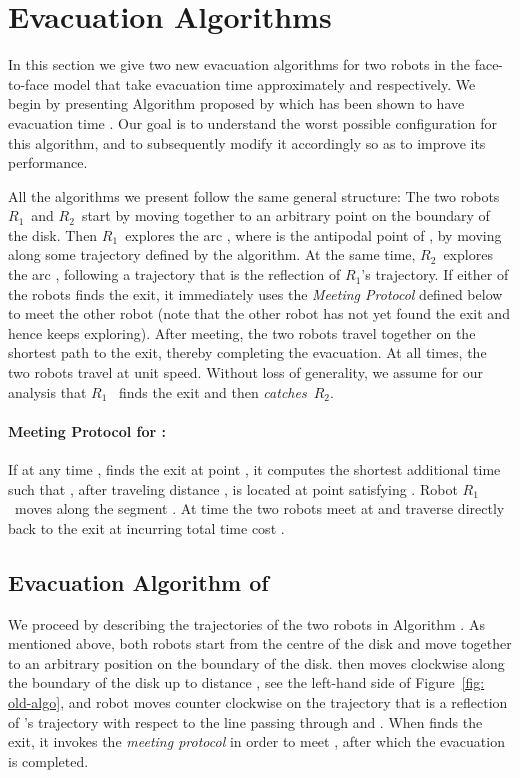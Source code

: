 \documentclass[
final
]{dmtcs-episciences}
\newcommand{\RA}{\ensuremath{R_1}}
\newcommand{\RB}{\ensuremath{R_2 }}
\newcommand{\ff}{face-to-face }
\theoremstyle{definition}
\begin{document}
\section{Evacuation Algorithms}
\label{sec:Evacuation Algorithms}


In this section we give two new evacuation algorithms for two robots in the  \ff model that take evacuation time approximately
 and  respectively. 
We begin by presenting  Algorithm  proposed by \cite{CGGKMP}
which has been shown to have evacuation time 
.
Our goal is to understand the worst possible configuration for this algorithm, and to subsequently modify it accordingly so as to improve its performance. 

 All the algorithms we present follow the same general structure: 
 The two robots \RA\ and \RB\ start by moving together to an arbitrary point  on the boundary of the disk. 
 Then \RA\ explores the arc , where  is the antipodal point of , by moving along some trajectory defined by the algorithm.
 At the same time, \RB\ explores the arc , following a trajectory that is the reflection of \RA's trajectory.
 If either of the robots finds the exit, it immediately uses the {\em Meeting Protocol} defined below to meet the other robot (note that the other robot has not yet found the exit and hence keeps exploring). 
 After meeting, the two robots travel together on the shortest path to the exit, thereby completing the evacuation. 
 At all times, the two robots travel at unit speed. 
 Without loss of generality, we assume for our analysis that \RA~ finds the exit and then {\em catches}~\RB. 



 \paragraph{Meeting Protocol for :}
If at any time ,    finds the exit at point , it 
computes the shortest additional time  such that , after traveling 
distance , is located at point  satisfying . 
Robot \RA\ moves along the segment . At time  the two robots meet 
at  and traverse  directly back to the exit at  incurring total time cost 
.

\subsection{Evacuation Algorithm  \texorpdfstring{}{Lg} of \texorpdfstring{\cite{CGGKMP}}{Lg}}


We proceed by describing the trajectories of the two robots in Algorithm  
. As mentioned above, both robots start 
from the centre  of the disk and move together to an arbitrary position  on the 
boundary of the disk.  then moves clockwise along the boundary of the disk up to distance , see the
left-hand side of Figure~\ref{fig: old-algo}, and robot  moves counter clockwise on the trajectory that is a reflection of 's trajectory with respect to the 
line passing through  and . When  finds the exit, it invokes the  {\it meeting protocol} in order to meet  , after which the evacuation is completed. 
\end{document}
